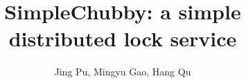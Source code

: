\documentclass[11pt,twocolumn]{article}
\begin{document}
\title{\bf SimpleChubby: a simple distributed lock service}
\author{Jing Pu, Mingyu Gao, Hang Qu}
\date{}
\maketitle
\thispagestyle{empty}










\end{document}
